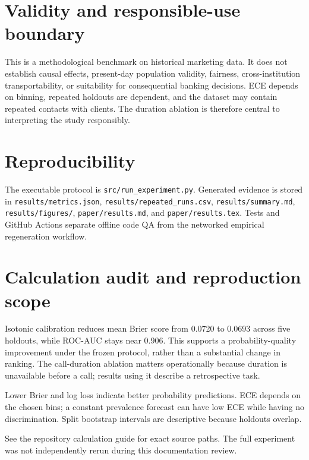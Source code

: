 \documentclass[11pt]{article}
\begin{document}


\section{Validity and responsible-use boundary}
This is a methodological benchmark on historical marketing data. It does not establish causal effects, present-day population validity, fairness, cross-institution transportability, or suitability for consequential banking decisions. ECE depends on binning, repeated holdouts are dependent, and the dataset may contain repeated contacts with clients. The duration ablation is therefore central to interpreting the study responsibly.

\section{Reproducibility}
The executable protocol is \texttt{src/run\_experiment.py}. Generated evidence is stored in \texttt{results/metrics.json}, \texttt{results/repeated\_runs.csv}, \texttt{results/summary.md}, \texttt{results/figures/}, \texttt{paper/results.md}, and \texttt{paper/results.tex}. Tests and GitHub Actions separate offline code QA from the networked empirical regeneration workflow.



\section{Calculation audit and reproduction scope}
Isotonic calibration reduces mean Brier score from 0.0720 to 0.0693 across five holdouts, while ROC-AUC stays near 0.906. This supports a probability-quality improvement under the frozen protocol, rather than a substantial change in ranking. The call-duration ablation matters operationally because duration is unavailable before a call; results using it describe a retrospective task.

Lower Brier and log loss indicate better probability predictions. ECE depends on the chosen bins; a constant prevalence forecast can have low ECE while having no discrimination. Split bootstrap intervals are descriptive because holdouts overlap.

See the repository calculation guide for exact source paths. The full experiment was not independently rerun during this documentation review.
\end{document}

